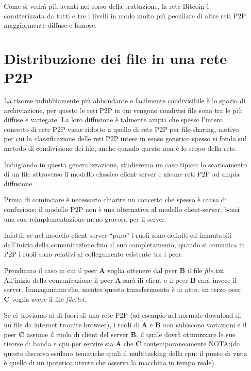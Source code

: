 Come si vedrà più avanti nel corso della trattazione, la rete Bitcoin è
caratterizzata da tutti e tre i livelli in modo molto più peculiare di
altre reti P2P maggiormente diffuse e famose.

\section{Distribuzione dei file in una rete
P2P}\label{distribuzione-dei-file-in-una-rete-p2p}

La risorse indubbiamente più abbondante e facilmente condivisibile è lo
spazio di archiviazione, per questo le reti P2P in cui vengono condivisi
file sono tra le più diffuse e variegate. La loro diffusione è talmente
ampia che spesso l'intero concetto di rete P2P viene ridotto a quello di
rete P2P per file-sharing, motivo per cui la classificazione delle reti
P2P intese in senso generico spesso si fonda sul metodo di condivisione
dei file, anche quando questo non è lo scopo della rete.

Indugiando in questa generalizzazione, studieremo un caso tipico: lo
scaricamento di un file attraverso il modello classico client-server e
alcune reti P2P ad ampia diffusione.

Prima di cominciare è necessario chiarire un concetto che spesso è causa
di confusione: il modello P2P non è una alternativa al modello
client-server, bensì una sua reimplementazione meno gravosa per il
server.

Infatti, se nel modello client-server ``puro'' i ruoli sono definiti ed
immutabili dall'inizio della comunicazione fino al suo completamento,
quando si comunica in P2P i ruoli sono relativi al collegamento
esistente tra i peer.

Prendiamo il caso in cui il peer \textbf{A} voglia ottenere dal peer
\textbf{B} il file \emph{file.txt}. All'inizio della comunicazione il
peer \textbf{A} sarà ili client e il peer \textbf{B} sarà invece il
server. Immaginiamo che, mentre questo transferimento è in atto, un
terzo peer \textbf{C} voglia avere il file \emph{file.txt}.

Se ci troviamo al di fuori di una rete P2P (ad esempio nel normale
download di un file da internet tramite browser), i ruoli di \textbf{A}
e \textbf{B} non subiscono variazioni e il peer \textbf{C} assume il
ruolo di client del server \textbf{B}, il quale dovrà ottimizzare le sue
risorse di banda e cpu per servire sia \textbf{A} che \textbf{C}
contemporaneamente NOTA:(da questo discorso esulano tematiche quali il
multitasking della cpu: il punto di vista è quello di un ipotetico
utente che osserva la macchina in tempo reale).

